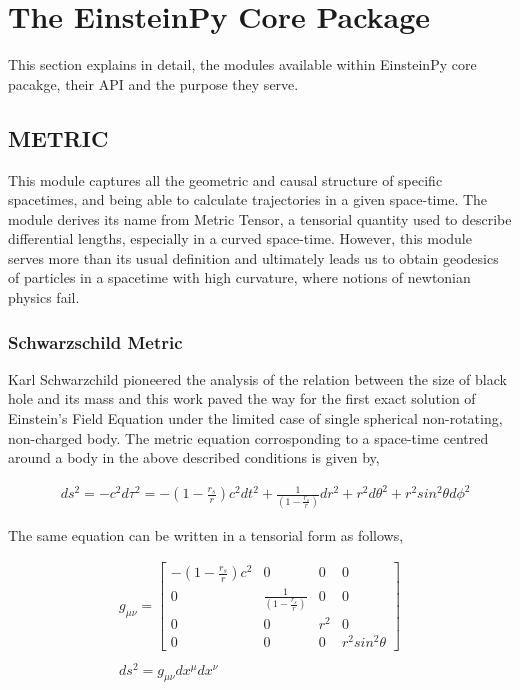 \documentclass{aastex63}
\begin{document}
\section{The EinsteinPy Core Package} \label{sec:CORE}
This section explains in detail, the modules available within EinsteinPy core pacakge, their API and the purpose they serve.
\subsection{METRIC}
This module captures all the geometric and causal structure of specific spacetimes, and being able to calculate trajectories in a given space-time. 
The module derives its name from Metric Tensor, a tensorial quantity used to describe differential lengths, especially in a curved space-time. 
However, this module serves more than its usual definition and ultimately leads us to obtain geodesics of particles in a spacetime with high curvature, where notions of newtonian physics fail.
\subsubsection{Schwarzschild Metric}
Karl Schwarzchild pioneered the analysis of the relation between the size of black hole and its mass and this work paved the way for the first exact solution of Einstein's Field Equation under the limited case of single spherical non-rotating, non-charged body. 
The metric equation corrosponding to a space-time centred around a body in the above described conditions is given by,

\begin{align}
& ds^2 = -c^2 d\tau ^2 = - (1 - \frac{r_s}{r})c^2 dt^2  + \frac{1}{(1 - \frac{r_s}{r})}dr^2 + r^2 d\theta ^2 + r^2 sin^2 \theta d\phi ^2
\end{align}

The same equation can be written in a tensorial form as follows,

\begin{gather}
g_{\mu \nu} = \begin{bmatrix} - (1 - \frac{r_s}{r})c^2 & 0 & 0 & 0 \\ 0 & \frac{1}{(1 - \frac{r_s}{r})} & 0 & 0 \\ 0 & 0 & r^2 & 0 \\ 0 & 0 & 0 &  r^2 sin^2 \theta \end{bmatrix} \\ 
\nonumber \\
ds^2 = g_{\mu \nu} dx^\mu dx^\nu
\end{gather}
\end{document}
